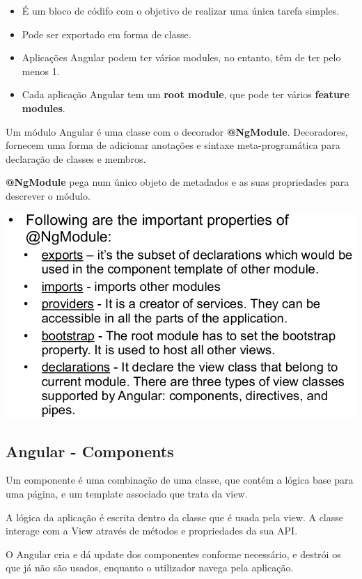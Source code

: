 \documentclass{article}
\begin{document}
\begin{itemize}
\item É um bloco de códifo com o objetivo de realizar uma única tarefa simples.
\item Pode ser exportado em forma de classe.
\item Aplicações Angular podem ter vários modules, no entanto, têm de ter pelo menos 1.
\item Cada aplicação Angular tem um \textbf{root module}, que pode ter vários
\textbf{feature modules}.
\end{itemize}

Um módulo Angular é uma classe com o decorador \textbf{@NgModule}. Decoradores,
fornecem uma forma de adicionar anotações e sintaxe meta-programática
para declaração de classes e membros.

\textbf{@NgModule} pega num único objeto de metadados e as suas propriedades
para descrever o módulo.

\begin{center}
  \includegraphics[scale=0.3]{2}
\end{center}

\pagebreak

\subsection{Angular - Components}

Um componente é uma combinação de uma classe, que contém a lógica base para uma página,
e um template associado que trata da view.

A lógica da aplicação é escrita dentro da classe que é usada pela view.
A classe interage com a View através de métodos e propriedades da sua API.

O Angular cria e dá update dos componentes conforme necessário, e destrói os
que já não são usados, enquanto o utilizador navega pela aplicação.
\end{document}
